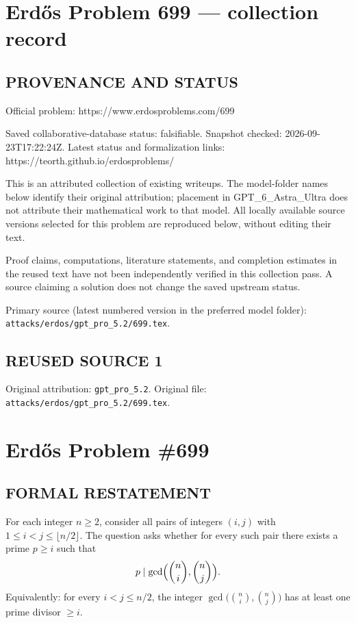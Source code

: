 \section*{Erd\H{o}s Problem 699 --- collection record}

\subsection*{PROVENANCE AND STATUS}
Official problem: https://www.erdosproblems.com/699

Saved collaborative-database status: falsifiable.
Snapshot checked: 2026-09-23T17:22:24Z.
Latest status and formalization links: https://teorth.github.io/erdosproblems/

This is an attributed collection of existing writeups. The model-folder names below identify their original attribution; placement in GPT\_6\_Astra\_Ultra does not attribute their mathematical work to that model. All locally available source versions selected for this problem are reproduced below, without editing their text.

Proof claims, computations, literature statements, and completion estimates in the reused text have not been independently verified in this collection pass. A source claiming a solution does not change the saved upstream status.

Primary source (latest numbered version in the preferred model folder): \texttt{attacks/erdos/gpt\_pro\_5.2/699.tex}.

\subsection*{REUSED SOURCE 1}
Original attribution: \texttt{gpt\_pro\_5.2}.
Original file: \texttt{attacks/erdos/gpt\_pro\_5.2/699.tex}.

\section*{Erd\H{o}s Problem \#699}

\subsection*{FORMAL RESTATEMENT}
For each integer $n\ge 2$, consider all pairs of integers $(i,j)$ with $1\le i<j\le \lfloor n/2\rfloor$.
The question asks whether for every such pair there exists a prime $p\ge i$ such that
\[p\mid \gcd\Bigl(\binom{n}{i},\binom{n}{j}\Bigr).
\]
Equivalently: for every $i<j\le n/2$, the integer $\gcd\bigl(\binom{n}{i},\binom{n}{j}\bigr)$ has at least one prime divisor $\ge i$.


